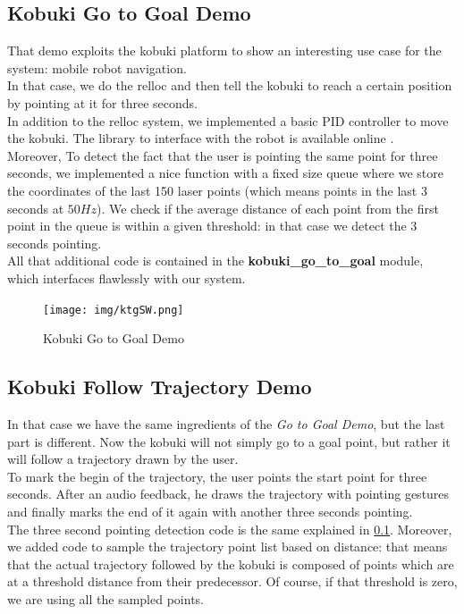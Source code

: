 \subsection{Kobuki Go to Goal Demo}\label{subs:kobukiGoToGoal}
That demo exploits the kobuki platform to show an interesting use case for the system: mobile robot navigation.\\
In that case, we do the relloc and then tell the kobuki to reach a certain position by pointing at it for three seconds.\\
In addition to the relloc system, we implemented a basic PID controller to move the kobuki. The library to interface with the robot is available online \cite{kobuki:ROS}.\\ Moreover, To detect the fact that the user is pointing the same point for three seconds, we implemented a nice function with a fixed size queue where we store the coordinates of the last 150 laser points (which means points in the last $3$ seconds at $50Hz$). We check if the average distance of each point from the first point in the queue is within a given threshold: in that case we detect the 3 seconds pointing.\\
All that additional code is contained in the \textbf{kobuki\_go\_to\_goal} module, which interfaces flawlessly with our system.
\begin{figure}
	\centering
	\texttt{[image: img/ktgSW.png]}%
	\caption{Kobuki Go to Goal Demo}
	\label{fig:goToGoalDemo}
\end{figure}
\subsection{Kobuki Follow Trajectory Demo}
In that case we have the same ingredients of the \emph{Go to Goal Demo}, but the last part is different. Now the kobuki will not simply go to a goal point, but rather it will follow a trajectory drawn by the user.\\
To mark the begin of the trajectory, the user points the start point for three seconds. After an audio feedback, he draws the trajectory with pointing gestures and finally marks the end of it again with another three seconds pointing.\\
The three second pointing detection code is the same explained in \ref{subs:kobukiGoToGoal}. Moreover, we added code to sample the trajectory point list based on distance: that means that the actual trajectory followed by the kobuki is composed of points which are at a threshold distance from their predecessor. Of course, if that threshold is zero, we are using all the sampled points.\\

